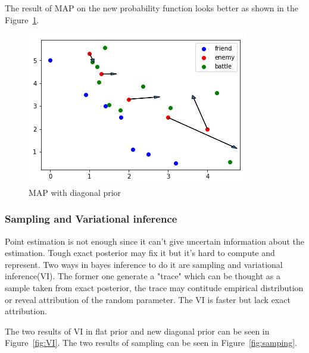 \documentclass{article}
\begin{document}
The result of MAP on the new probability function looks better as shown in the Figure~\ref{fig:MAPtwo}.

\begin{figure}[h!]
\includegraphics[width=0.6\linewidth]{MAP2.png}
\caption{MAP with diagonal prior}
\label{fig:MAPtwo}
\end{figure}

\subsubsection{Sampling and Variational inference}

Point estimation is not enough since it can't give uncertain information about the estimation.
Tough exact posterior may fix it but it's hard to compute and represent. Two ways in bayes inference 
to do it are sampling and variational inference(VI). The former one generate a "trace" which can be thought
as a sample taken from exact posterior, the trace may contitude empirical distribution or reveal 
attribution of the random parameter. The VI is faster but lack exact attribution.

The two results of VI in flat prior and new diagonal prior can be seen in Figure~\ref{fig:VI}.
The two results of sampling can be seen in Figure~\ref{fig:samping}.
\end{document}
